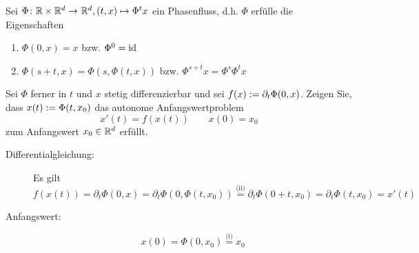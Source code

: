 \begin{exercisePage}
\begin{exercise}
	Sei $\abb{\Phi}{\R \times \Rd}{\Rd}, (t,x) \mapsto \Phi^t x$ ein Phasenfluss, d.h. $\Phi$ erfülle die Eigenschaften
	\begin{enumerate}[label=(\roman*), nolistsep, topsep=-\parskip]
		\item $\Phi(0,x) = x$ bzw. $\Phi^0 = \operatorname{id}$
		\item $\Phi(s+t,x) = \Phi(s,\Phi(t,x))$ bzw. $\Phi^{s+t} x = \Phi^s \Phi^t x$
	\end{enumerate}
	Sei $\Phi$ ferner in $t$ und $x$ stetig differenzierbar und sei $f(x) \mathrel{:=} \partial_t \Phi(0,x)$. Zeigen Sie, dass $x(t) \mathrel{:=} \Phi(t,x_0)$ das autonome Anfangswertproblem
	\begin{equation*}
		x'(t) = f(x(t)) \qquad x(0) = x_0
	\end{equation*}
	zum Anfangswert $x_0 \in \mathbb{R}^d$ erfüllt.
\end{exercise}

\begin{description}
	\item[Differentialgleichung:] Es gilt
	\begin{equation*}
			f(x(t)) = \partial_t \Phi(0,x) = \partial_t \Phi(0, \Phi(t,x_0)) \overset{\text{(ii)}}{=} \partial_t \Phi(0+t, x_0) = \partial_t \Phi(t,x_0) = x'(t)
	\end{equation*}
	\item[Anfangswert:]
	\begin{equation*}
		x(0) = \Phi(0,x_0) \overset{\text{(i)}}{=} x_0
	\end{equation*}
\end{description}

\end{exercisePage}
